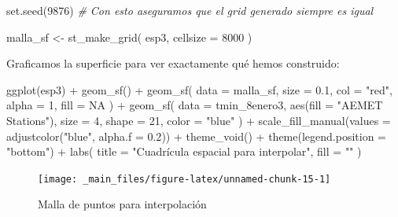 \documentclass[
]{book}
\newenvironment{Shaded}{\begin{snugshade}}{\end{snugshade}}
\newcommand{\AttributeTok}[1]{\textcolor[rgb]{0.77,0.63,0.00}{#1}}
\newcommand{\CommentTok}[1]{\textcolor[rgb]{0.56,0.35,0.01}{\textit{#1}}}
\newcommand{\ConstantTok}[1]{\textcolor[rgb]{0.00,0.00,0.00}{#1}}
\newcommand{\DecValTok}[1]{\textcolor[rgb]{0.00,0.00,0.81}{#1}}
\newcommand{\FloatTok}[1]{\textcolor[rgb]{0.00,0.00,0.81}{#1}}
\newcommand{\FunctionTok}[1]{\textcolor[rgb]{0.00,0.00,0.00}{#1}}
\newcommand{\NormalTok}[1]{#1}
\newcommand{\OtherTok}[1]{\textcolor[rgb]{0.56,0.35,0.01}{#1}}
\newcommand{\SpecialCharTok}[1]{\textcolor[rgb]{0.00,0.00,0.00}{#1}}
\newcommand{\StringTok}[1]{\textcolor[rgb]{0.31,0.60,0.02}{#1}}
\begin{document}
\begin{Shaded}
\begin{Highlighting}[]
\FunctionTok{set.seed}\NormalTok{(}\DecValTok{9876}\NormalTok{) }\CommentTok{\# Con esto aseguramos que el grid generado siempre es igual}

\NormalTok{malla\_sf }\OtherTok{\textless{}{-}} \FunctionTok{st\_make\_grid}\NormalTok{(}
\NormalTok{  esp3,}
  \AttributeTok{cellsize =} \DecValTok{8000}
\NormalTok{)}
\end{Highlighting}
\end{Shaded}

Graficamos la superficie para ver exactamente qué hemos construido:

\begin{Shaded}
\begin{Highlighting}[]

\FunctionTok{ggplot}\NormalTok{(esp3) }\SpecialCharTok{+}
  \FunctionTok{geom\_sf}\NormalTok{() }\SpecialCharTok{+}
  \FunctionTok{geom\_sf}\NormalTok{(}
    \AttributeTok{data =}\NormalTok{ malla\_sf,}
    \AttributeTok{size =} \FloatTok{0.1}\NormalTok{,}
    \AttributeTok{col =} \StringTok{"red"}\NormalTok{, }\AttributeTok{alpha =} \DecValTok{1}\NormalTok{,}
    \AttributeTok{fill =} \ConstantTok{NA}
\NormalTok{  ) }\SpecialCharTok{+}
  \FunctionTok{geom\_sf}\NormalTok{(}
    \AttributeTok{data =}\NormalTok{ tmin\_8enero3,}
    \FunctionTok{aes}\NormalTok{(}\AttributeTok{fill =} \StringTok{"AEMET Stations"}\NormalTok{), }\AttributeTok{size =} \DecValTok{4}\NormalTok{, }\AttributeTok{shape =} \DecValTok{21}\NormalTok{,}
    \AttributeTok{color =} \StringTok{"blue"}
\NormalTok{  ) }\SpecialCharTok{+}
  \FunctionTok{scale\_fill\_manual}\NormalTok{(}\AttributeTok{values =} \FunctionTok{adjustcolor}\NormalTok{(}\StringTok{"blue"}\NormalTok{, }\AttributeTok{alpha.f =} \FloatTok{0.2}\NormalTok{)) }\SpecialCharTok{+}
  \FunctionTok{theme\_void}\NormalTok{() }\SpecialCharTok{+}
  \FunctionTok{theme}\NormalTok{(}\AttributeTok{legend.position =} \StringTok{"bottom"}\NormalTok{) }\SpecialCharTok{+}
  \FunctionTok{labs}\NormalTok{(}
    \AttributeTok{title =} \StringTok{"Cuadrícula espacial para interpolar"}\NormalTok{,}
    \AttributeTok{fill =} \StringTok{""}
\NormalTok{  )}
\end{Highlighting}
\end{Shaded}

\begin{figure}

{\centering \texttt{[image: \_main\_files/figure-latex/unnamed-chunk-15-1]} 

}

\caption{Malla de puntos para interpolación}\label{fig:unnamed-chunk-15}
\end{figure}
\end{document}
